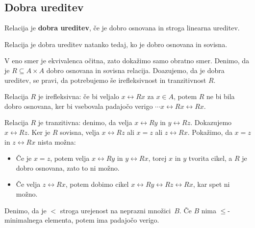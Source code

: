 \subsection{Dobra ureditev}

\begin{definicija}
  Relacija je \textbf{dobra ureditev}, če je dobro osnovana in stroga linearna ureditev.
\end{definicija}

\begin{izrek}
  Relacija je dobra ureditev natanko tedaj, ko je dobro osnovana in sovisna.
\end{izrek}

\begin{dokaz}
  V eno smer je ekvivalenca očitna, zato dokažimo samo obratno smer. Denimo, da je
  $R \subseteq A \times A$ dobro osnovana in sovisna relacija. Doazujemo, da je dobra ureditev, se pravi,
  da potrebujemo še irefleksivnost in tranzitivnost $R$.

  Relacija $R$ je irefleksivna: če bi veljalo $x \rel{R} x$ za $x \in A$, potem $R$ ne bi bila dobro
  osnovana, ker bi vsebovala padajočo verigo $\cdots x \rel{R} x \rel{R} x$.

  Relacija $R$ je tranzitivna: denimo, da velja $x \rel{R} y$ in $y \rel{R} z$. Dokazujemo $x \rel{R} z$. Ker je $R$
  sovisna, velja $x \rel{R} z$ ali $x = z$ ali $z \rel{R} x$. Pokažimo, da $x = z$ in $z \rel{R} x$ nista
  možna:
  \begin{itemize}
  \item Če je $x = z$, potem velja $x \rel{R} y$ in $y \rel{R} x$, torej $x$ in $y$ tvorita cikel, a
    $R$ je dobro osnovana, zato to ni možno.
  \item Če velja $z \rel{R} x$, potem dobimo cikel $x \rel{R} y \rel{R} z \rel{R} x$, kar spet ni možno.
  \end{itemize}
\end{dokaz}

\begin{lema}
  \label{lem:nepr-min-veriga}%
  Denimo, da je $<$ stroga urejenost na neprazni množici~$B$. Če $B$ nima
  $\leq$-minimalnega elementa, potem ima padajočo verigo.
\end{lema}

